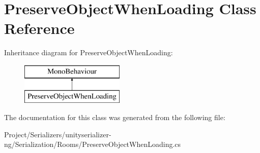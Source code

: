 \hypertarget{class_preserve_object_when_loading}{}\section{Preserve\+Object\+When\+Loading Class Reference}
\label{class_preserve_object_when_loading}
Inheritance diagram for Preserve\+Object\+When\+Loading\+:\begin{figure}[H]
\begin{center}
\leavevmode
\includegraphics[height=2.000000cm]{class_preserve_object_when_loading}
\end{center}
\end{figure}


The documentation for this class was generated from the following file\+:\begin{DoxyCompactItemize}
\item 
Project/\+Serializers/unityserializer-\/ng/\+Serialization/\+Rooms/Preserve\+Object\+When\+Loading.\+cs\end{DoxyCompactItemize}

